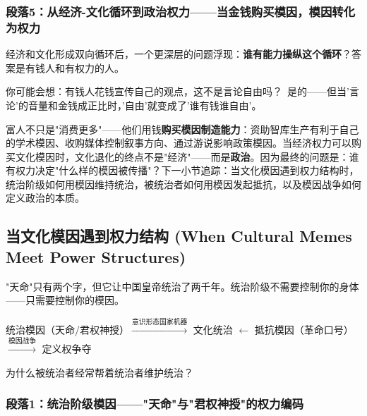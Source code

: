 \documentclass[../main.tex]{subfiles}
\begin{document}
	\subsubsection*{段落5：从经济-文化循环到政治权力——当金钱购买模因，模因转化为权力}

	经济和文化形成双向循环后，一个更深层的问题浮现：\textbf{谁有能力操纵这个循环}？答案是有钱人和有权力的人。

	\begin{tcolorbox}[colback=yellow!5, title=\textit{读者行为预测}]

		你可能会想：有钱人花钱宣传自己的观点，这不是言论自由吗？\ 是的——但当'言论'的音量和金钱成正比时，'自由'就变成了'谁有钱谁自由'。

	\end{tcolorbox}

富人不只是"消费更多"——他们用钱\textbf{购买模因制造能力}：资助智库生产有利于自己的学术模因、收购媒体控制叙事方向、通过游说影响政策模因。当经济权力可以购买文化模因时，文化退化的终点不是"经济"——而是\textbf{政治}。因为最终的问题是：谁有权力决定"什么样的模因被传播"？下一小节追踪：当文化模因遇到权力结构时，统治阶级如何用模因维持统治，被统治者如何用模因发起抵抗，以及模因战争如何定义政治的本质。

	\subsection{当文化模因遇到权力结构 (When Cultural Memes Meet Power Structures)}

	\begin{motivation}

		"天命"只有两个字，但它让中国皇帝统治了两千年。统治阶级不需要控制你的身体——只需要控制你的模因。

	\end{motivation}

	\begin{logicmap}

		统治模因（天命/君权神授）$\xrightarrow{\text{意识形态国家机器}}$ 文化统治 $\leftarrow$ 抵抗模因（革命口号）$\xrightarrow{\text{模因战争}}$ 定义权争夺

	\end{logicmap}

	\begin{questionbox}

		为什么被统治者经常帮着统治者维护统治？

	\end{questionbox}

	\subsubsection*{段落1：统治阶级模因——"天命"与"君权神授"的权力编码}
\end{document}
